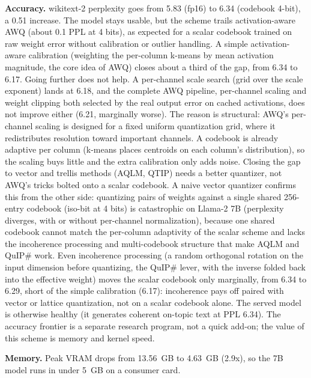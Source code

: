 \documentclass[11pt]{article}
\begin{document}
\textbf{Accuracy.} wikitext-2 perplexity goes from 5.83 (fp16) to 6.34 (codebook
4-bit), a 0.51 increase. The model stays usable, but the scheme trails
activation-aware AWQ (about 0.1 PPL at 4 bits), as expected for a scalar codebook
trained on raw weight error without calibration or outlier handling. A simple
activation-aware calibration (weighting the per-column k-means by mean activation
magnitude, the core idea of AWQ) closes about a third of the gap, from 6.34 to 6.17.
Going further does not help. A per-channel scale search (grid over the scale
exponent) lands at 6.18, and the complete AWQ pipeline, per-channel scaling and
weight clipping both selected by the real output error on cached activations, does
not improve either (6.21, marginally worse). The reason is structural: AWQ's
per-channel scaling is designed for a fixed uniform quantization grid, where it
redistributes resolution toward important channels. A codebook is already adaptive
per column (k-means places centroids on each column's distribution), so the scaling
buys little and the extra calibration only adds noise. Closing the gap to vector and
trellis methods (AQLM, QTIP) needs a better quantizer, not AWQ's tricks bolted onto a
scalar codebook. A naive vector quantizer confirms this from the other side: quantizing
pairs of weights against a single shared 256-entry codebook (iso-bit at 4 bits) is
catastrophic on Llama-2 7B (perplexity diverges, with or without per-channel
normalization), because one shared codebook cannot match the per-column adaptivity of
the scalar scheme and lacks the incoherence processing and multi-codebook structure
that make AQLM and QuIP\# work. Even incoherence processing (a random orthogonal
rotation on the input dimension before quantizing, the QuIP\# lever, with the inverse
folded back into the effective weight) moves the scalar codebook only marginally, from
6.34 to 6.29, short of the simple calibration (6.17): incoherence pays off paired with
vector or lattice quantization, not on a scalar codebook alone. The served model is
otherwise healthy (it generates coherent on-topic text at PPL 6.34). The accuracy
frontier is a separate research program, not a quick add-on; the value of this scheme
is memory and kernel speed.

\textbf{Memory.} Peak VRAM drops from 13.56~GB to 4.63~GB (2.9x), so the 7B model
runs in under 5~GB on a consumer card.
\end{document}
